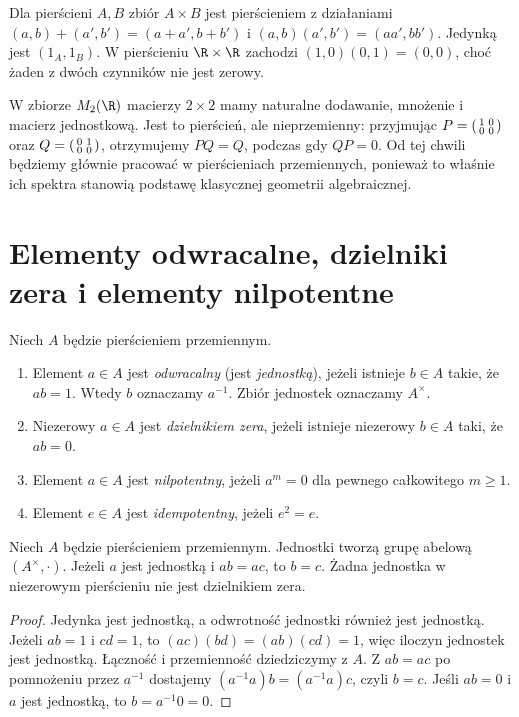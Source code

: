 \begin{przyklad}
Dla pierścieni $A,B$ zbiór $A\times B$ jest pierścieniem z działaniami
$(a,b)+(a',b')=(a+a',b+b')$ i
$(a,b)(a',b')=(aa',bb')$. Jedynką jest $(1_A,1_B)$.
W pierścieniu $\R\times\R$ zachodzi $(1,0)(0,1)=(0,0)$,
choć żaden z dwóch czynników nie jest zerowy.
\end{przyklad}

\begin{przyklad}
W zbiorze $M_2(\R)$ macierzy $2\times2$ mamy naturalne dodawanie,
mnożenie i macierz jednostkową. Jest to pierścień, ale nieprzemienny:
przyjmując
$P=\begin{psmallmatrix}1&0\\0&0\end{psmallmatrix}$ oraz
$Q=\begin{psmallmatrix}0&1\\0&0\end{psmallmatrix}$,
otrzymujemy $PQ=Q$, podczas gdy $QP=0$.
Od tej chwili będziemy głównie pracować w pierścieniach przemiennych,
ponieważ to właśnie ich spektra stanowią podstawę klasycznej geometrii
algebraicznej.
\end{przyklad}

\section{Elementy odwracalne, dzielniki zera i elementy nilpotentne}

\begin{definicja}
Niech $A$ będzie pierścieniem przemiennym.
\begin{enumerate}[label=\arabic*)]
\item Element $a\in A$ jest \emph{odwracalny} (jest \emph{jednostką}),
jeżeli istnieje $b\in A$ takie, że $ab=1$. Wtedy $b$ oznaczamy $a^{-1}$.
Zbiór jednostek oznaczamy $A^\times$.
\item Niezerowy $a\in A$ jest \emph{dzielnikiem zera}, jeżeli istnieje
niezerowy $b\in A$ taki, że $ab=0$.
\item Element $a\in A$ jest \emph{nilpotentny}, jeżeli $a^m=0$
dla pewnego całkowitego $m\ge1$.
\item Element $e\in A$ jest \emph{idempotentny}, jeżeli $e^2=e$.
\end{enumerate}
\end{definicja}

\begin{stwierdzenie}
Niech $A$ będzie pierścieniem przemiennym. Jednostki tworzą grupę
abelową $(A^\times,\cdot)$. Jeżeli $a$ jest jednostką i $ab=ac$,
to $b=c$. Żadna jednostka w niezerowym pierścieniu nie jest dzielnikiem zera.
\end{stwierdzenie}
\begin{proof}
Jedynka jest jednostką, a odwrotność jednostki również jest jednostką.
Jeżeli $ab=1$ i $cd=1$, to $(ac)(bd)=(ab)(cd)=1$, więc iloczyn jednostek
jest jednostką. Łączność i przemienność dziedziczymy z $A$.
Z $ab=ac$ po pomnożeniu przez $a^{-1}$ dostajemy
$(a^{-1}a)b=(a^{-1}a)c$, czyli $b=c$.
Jeśli $ab=0$ i $a$ jest jednostką, to $b=a^{-1}0=0$.
\end{proof}

